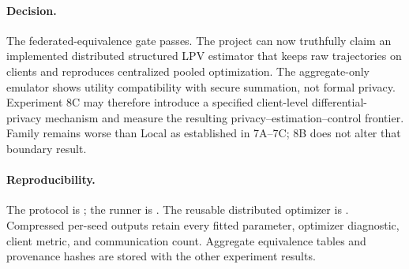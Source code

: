 \paragraph{Decision.}
The federated-equivalence gate passes. The project can now truthfully claim an
implemented distributed structured LPV estimator that keeps raw trajectories on
clients and reproduces centralized pooled optimization. The aggregate-only
emulator shows utility compatibility with secure summation, not formal privacy.
Experiment 8C may therefore introduce a specified client-level differential-
privacy mechanism and measure the resulting privacy--estimation--control frontier.
Family remains worse than Local as established in 7A--7C; 8B does not alter that
boundary result.

\paragraph{Reproducibility.}
The protocol is ; the runner is
. The reusable
distributed optimizer is . Compressed
per-seed outputs retain every fitted parameter, optimizer diagnostic, client
metric, and communication count. Aggregate equivalence tables and provenance
hashes are stored with the other experiment results.
